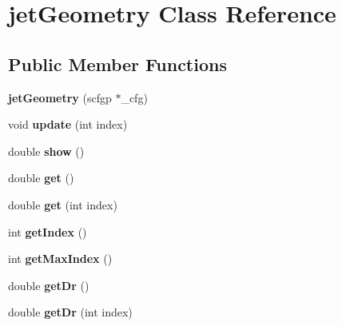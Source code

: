 \hypertarget{classjetGeometry}{\section{jet\-Geometry Class Reference}
\label{classjetGeometry}
}
\subsection*{Public Member Functions}
\begin{DoxyCompactItemize}
\item 
\hypertarget{classjetGeometry_a4ca3e81d2ce21b08e8df9638eb094b33}{{\bfseries jet\-Geometry} (scfgp $\ast$\-\_\-cfg)}\label{classjetGeometry_a4ca3e81d2ce21b08e8df9638eb094b33}

\item 
\hypertarget{classjetGeometry_a8fb63607bae0a7ec9829d1cbf62cba76}{void {\bfseries update} (int index)}\label{classjetGeometry_a8fb63607bae0a7ec9829d1cbf62cba76}

\item 
\hypertarget{classjetGeometry_a8594bcbc6a54649cedea0cb2ec77c1d8}{double {\bfseries show} ()}\label{classjetGeometry_a8594bcbc6a54649cedea0cb2ec77c1d8}

\item 
\hypertarget{classjetGeometry_a0596785494429f321d8c222896069b66}{double {\bfseries get} ()}\label{classjetGeometry_a0596785494429f321d8c222896069b66}

\item 
\hypertarget{classjetGeometry_a65ae1b4112255e05c15fdddd79328d1d}{double {\bfseries get} (int index)}\label{classjetGeometry_a65ae1b4112255e05c15fdddd79328d1d}

\item 
\hypertarget{classjetGeometry_adf1862920d3b2d378ae3a69adb6925df}{int {\bfseries get\-Index} ()}\label{classjetGeometry_adf1862920d3b2d378ae3a69adb6925df}

\item 
\hypertarget{classjetGeometry_ac164863c15809691e3160b11253c4a11}{int {\bfseries get\-Max\-Index} ()}\label{classjetGeometry_ac164863c15809691e3160b11253c4a11}

\item 
\hypertarget{classjetGeometry_abb4bfa533ecdb5fc651daab48902205a}{double {\bfseries get\-Dr} ()}\label{classjetGeometry_abb4bfa533ecdb5fc651daab48902205a}

\item 
\hypertarget{classjetGeometry_a1bb18dbf002061c08d7695a93edd3530}{double {\bfseries get\-Dr} (int index)}\label{classjetGeometry_a1bb18dbf002061c08d7695a93edd3530}


\end{DoxyCompactItemize}

